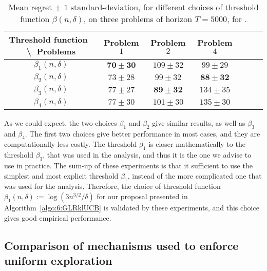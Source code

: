 \begin{small} %
\begin{table}[ht]
    \begin{small} %
    \centering
    \begin{tabular}{c|cccccc}
        \textbf{Threshold function} $\;$ \textbackslash $\;$ \textbf{Problems} & Problem $1$ & Problem $2$ & Problem $4$ \\
        \hline
        $\beta_1(n,\delta)$ & $\mathbf{70 \pm 30}$ & $109 \pm 32$ & $99 \pm 29$ \\
        $\beta_2(n,\delta)$ & $73 \pm 28$ & $99 \pm 32$ & $\mathbf{88 \pm 32}$ \\
        $\beta_3(n,\delta)$ & $77 \pm 27$ & $\mathbf{89 \pm 32}$ & $134 \pm 35$ \\
        $\beta_4(n,\delta)$ & $77 \pm 30$ & $101 \pm 30$ & $135 \pm 30$
    \end{tabular}
    \caption{Mean regret $\pm$ $1$ standard-deviation, for different choices of threshold function $\beta(n,\delta)$, on three problems of horizon $T=5000$, for \GLRklUCB.}
    \label{table:6:exploringDifferentThresholdFunctions}
    \end{small} %
\end{table}
\end{small} %

As we could expect, the two choices $\beta_1$ and $\beta_2$ give similar results, as well as $\beta_3$ and $\beta_4$. The first two choices give better performance in most cases, and they are computationally less costly.
The threshold $\beta_1$ is closer mathematically to the threshold $\beta_3$, that was used in the analysis, and thus it is the one we advise to use in practice.
The sum-up of these experiments is that it sufficient to use the simplest and most explicit threshold $\beta_1$, instead of the more complicated one that was used for the analysis.
Therefore, the choice of threshold function $\beta_1(n, \delta) := \log\left(3 n^{3/2} / \delta\right)$ for our proposal \GLRklUCB{} presented in Algorithm~\ref{algo:6:GLRklUCB} is validated by these experiments, and this choice gives good empirical performance.


\subsection{Comparison of mechanisms used to enforce uniform exploration}\label{sec:6:exploringDifferentForcedExplorationMechanisms}

